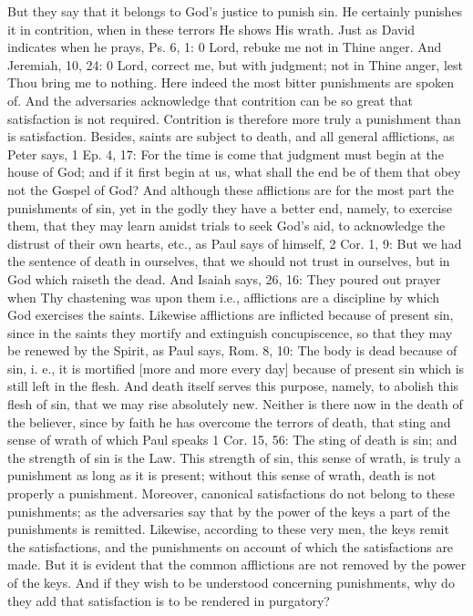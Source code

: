 But they say that it belongs to God's justice to punish sin.  He
certainly punishes it in contrition, when in these terrors He shows
His wrath.  Just as David indicates when he prays, Ps. 6, 1: 0 Lord,
rebuke me not in Thine anger.  And Jeremiah, 10, 24: 0 Lord, correct
me, but with judgment; not in Thine anger, lest Thou bring me to
nothing.  Here indeed the most bitter punishments are spoken of.  And
the adversaries acknowledge that contrition can be so great that
satisfaction is not required.  Contrition is therefore more truly a
punishment than is satisfaction.  Besides, saints are subject to
death, and all general afflictions, as Peter says, 1 Ep. 4, 17: For
the time is come that judgment must begin at the house of God; and if
it first begin at us, what shall the end be of them that obey not the
Gospel of God?  And although these afflictions are for the most part
the punishments of sin, yet in the godly they have a better end,
namely, to exercise them, that they may learn amidst trials to seek
God's aid, to acknowledge the distrust of their own hearts, etc., as
Paul says of himself, 2 Cor. 1, 9: But we had the sentence of death
in ourselves, that we should not trust in ourselves, but in God which
raiseth the dead.  And Isaiah says, 26, 16: They poured out prayer
when Thy chastening was upon them i.e., afflictions are a discipline
by which God exercises the saints.  Likewise afflictions are
inflicted because of present sin, since in the saints they mortify
and extinguish concupiscence, so that they may be renewed by the
Spirit, as Paul says, Rom. 8, 10: The body is dead because of sin, i.
e., it is mortified [more and more every day] because of present sin
which is still left in the flesh.  And death itself serves this
purpose, namely, to abolish this flesh of sin, that we may rise
absolutely new.  Neither is there now in the death of the believer,
since by faith he has overcome the terrors of death, that sting and
sense of wrath of which Paul speaks 1 Cor. 15, 56: The sting of death
is sin; and the strength of sin is the Law.  This strength of sin,
this sense of wrath, is truly a punishment as long as it is present;
without this sense of wrath, death is not properly a punishment.
Moreover, canonical satisfactions do not belong to these punishments;
as the adversaries say that by the power of the keys a part of the
punishments is remitted.  Likewise, according to these very men, the
keys remit the satisfactions, and the punishments on account of which
the satisfactions are made.  But it is evident that the common
afflictions are not removed by the power of the keys.  And if they
wish to be understood concerning punishments, why do they add that
satisfaction is to be rendered in purgatory?


